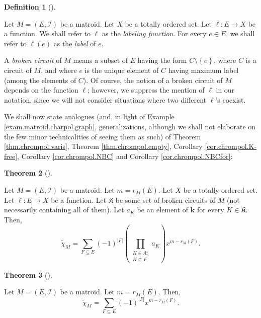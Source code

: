 \documentclass[numbers=enddot,12pt,final,onecolumn,notitlepage]{scrartcl}%
\theoremstyle{definition}
\newtheorem{theo}{Theorem}[section]
\newenvironment{theorem}[1][]
{\begin{theo}[#1]\begin{leftbar}}
{\end{leftbar}\end{theo}}
\newtheorem{defi}[theo]{Definition}
\newenvironment{definition}[1][]
{\begin{defi}[#1]\begin{leftbar}}
{\end{leftbar}\end{defi}}
\let\sumnonlimits\sum
\let\prodnonlimits\prod
\renewcommand{\sum}{\sumnonlimits\limits}
\renewcommand{\prod}{\prodnonlimits\limits}
\begin{document}
\begin{definition}
\label{def.matroid.BC}Let $M=\left(  E,\mathcal{I}\right)  $ be a matroid. Let
$X$ be a totally ordered set. Let $\ell:E\rightarrow X$ be a function. We
shall refer to $\ell$ as the \textit{labeling function}. For every $e\in E$,
we shall refer to $\ell\left(  e\right)  $ as the \textit{label} of $e$.

A \textit{broken circuit} of $M$ means a subset of $E$ having the form
$C\setminus\left\{  e\right\}  $, where $C$ is a circuit of $M$, and where $e$
is the unique element of $C$ having maximum label (among the elements of $C$).
Of course, the notion of a broken circuit of $M$ depends on the function
$\ell$; however, we suppress the mention of $\ell$ in our notation, since we
will not consider situations where two different $\ell$'s coexist.
\end{definition}

We shall now state analogues (and, in light of Example
\ref{exam.matroid.charpol.graph}, generalizations, although we shall not
elaborate on the few minor technicalities of seeing them as such) of Theorem
\ref{thm.chrompol.varis}, Theorem \ref{thm.chrompol.empty}, Corollary
\ref{cor.chrompol.K-free}, Corollary \ref{cor.chrompol.NBC} and Corollary
\ref{cor.chrompol.NBCfor}:

\begin{theorem}
\label{thm.matroid.charpol.varis}Let $M=\left(  E,\mathcal{I}\right)  $ be a
matroid. Let $m=r_{M}\left(  E\right)  $. Let $X$ be a totally ordered set.
Let $\ell:E\rightarrow X$ be a function. Let $\mathfrak{K}$ be some set of
broken circuits of $M$ (not necessarily containing all of them). Let $a_{K}$
be an element of $\mathbf{k}$ for every $K\in\mathfrak{K}$. Then,%
\[
\widetilde{\chi}_{M}=\sum_{F\subseteq E}\left(  -1\right)  ^{\left\vert
F\right\vert }\left(  \prod_{\substack{K\in\mathfrak{K};\\K\subseteq F}%
}a_{K}\right)  x^{m-r_{M}\left(  F\right)  }.
\]

\end{theorem}

\begin{theorem}
\label{thm.matroid.charpol.empty}Let $M=\left(  E,\mathcal{I}\right)  $ be a
matroid. Let $m=r_{M}\left(  E\right)  $. Then,%
\[
\widetilde{\chi}_{M}=\sum_{F\subseteq E}\left(  -1\right)  ^{\left\vert
F\right\vert }x^{m-r_{M}\left(  F\right)  }.
\]

\end{theorem}
\end{document}
